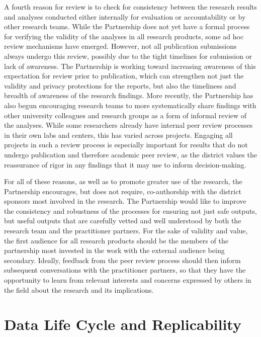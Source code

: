 A fourth reason for review is to check for consistency between the research results and analyses conducted either internally for evaluation or accountability or by other research teams. While the Partnership does not yet have a formal process for verifying the validity of the analyses in all research products, some ad hoc review mechanisms have emerged. However, not all publication submissions always undergo this review, possibly due to the tight timelines for submission or lack of awareness. The Partnership is working toward increasing awareness of this expectation for review prior to publication, which can strengthen not just the validity and privacy protections for the reports, but also the timeliness and breadth of awareness of the research findings. More recently, the Partnership has also begun encouraging research teams to more systematically share findings with other university colleagues and research groups as a form of informal review of the analyses. While some researchers already have internal peer review processes in their own labs and centers, this has varied across projects. Engaging all projects in such a review process is especially important for results that do not undergo publication and therefore academic peer review, as the district values the reassurance of rigor in any findings that it may use to inform decision-making.

For all of these reasons, as well as to promote greater use of the research, the Partnership encourages, but does not require, co-authorship with the district sponsors most involved in the research. The Partnership would like to improve the consistency and robustness of the processes for ensuring not just safe outputs, but useful outputs that are carefully vetted and well understood by both the research team and the practitioner partners. For the sake of validity and value, the first audience for all research products should be the members of the partnership most invested in the work with the external audience being secondary. Ideally, feedback from the peer review process should then inform subsequent conversations with the practitioner partners, so that they have the opportunity to learn from relevant interests and concerns expressed by others in the field about the research and its implications.

\hypertarget{data-life-cycle-and-replicability-3}{%
\section{Data Life Cycle and Replicability}\label{data-life-cycle-and-replicability-3}}

